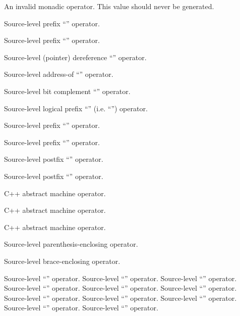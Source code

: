 An invalid monadic operator.  This value should never be generated.

Source-level prefix ``\code{+}'' operator.

Source-level prefix ``\code{-}'' operator. 

Source-level (pointer) dereference ``\code{*}'' operator.

Source-level address-of ``\code{\&}'' operator.

Source-level bit complement ``\code{\~}'' operator.

Source-level logical prefix ``\code{\!}'' (i.e. ``'') operator.

Source-level prefix ``\code{++}'' operator.

Source-level prefix ``\code{--}'' operator.

Source-level postfix ``\code{++}'' operator.

Source-level postfix ``\code{--}'' operator.

 C++ abstract machine operator.

 C++ abstract machine operator.

 C++ abstract machine operator.

 Source-level parenthesis-enclosing operator.

 Source-level brace-enclosing operator.

 Source-level ``'' operator.
 Source-level ``'' operator.
 Source-level ``'' operator.
 Source-level ``'' operator.
 Source-level ``'' operator.
 Source-level ``'' operator.
 Source-level ``'' operator.
 Source-level ``'' operator.
 Source-level ``'' operator.
 Source-level ``'' operator.
 Source-level ``'' operator.

